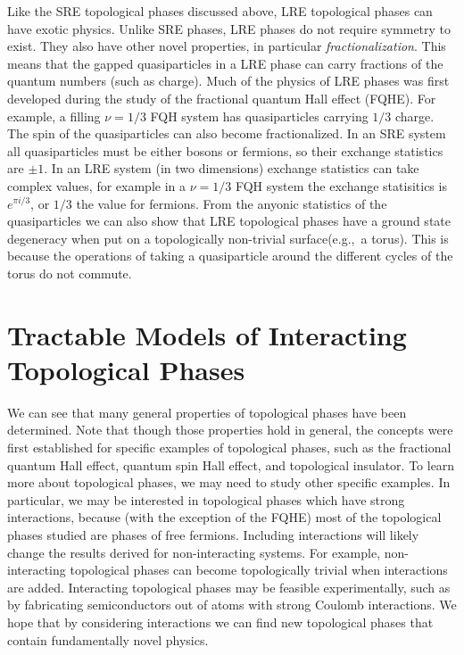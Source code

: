 Like the SRE topological phases discussed above, LRE topological phases can have exotic physics. Unlike SRE phases, LRE phases do not require symmetry to exist. They also have other novel properties, in particular \emph{fractionalization}. This means that the gapped quasiparticles in a LRE phase can carry fractions of the quantum numbers (such as charge). Much of the physics of LRE phases was first developed during the study of the fractional quantum Hall effect (FQHE).\cite{Wen_book} For example, a filling $\nu=1/3$ FQH system has quasiparticles carrying $1/3$ charge\cite{Laughlin-PhysRevLett.50.1395}. The spin of the quasiparticles can also become fractionalized. In an SRE system all quasiparticles must be either bosons or fermions, so their exchange statistics are $\pm 1$. 
In an LRE system (in two dimensions) exchange statistics can take complex values, for example in a $\nu=1/3$ FQH system the exchange statisitics is $e^{\pi i/3}$, or $1/3$ the value for fermions.
From the anyonic statistics of the quasiparticles we can also show that LRE topological phases have a ground state degeneracy when put on a topologically non-trivial surface(e.g.,~a torus). This is because the operations of taking a quasiparticle around the different cycles of the torus do not commute.


\section{Tractable Models of Interacting Topological Phases}

	We can see that many general properties of topological phases have been determined. Note that though those properties hold in general, the concepts were first established for specific examples of topological phases, such as the fractional quantum Hall effect, quantum spin Hall effect, and topological insulator. To learn more about topological phases, we may need to study other specific examples. In particular, we may be interested in topological phases which have strong interactions, because (with the exception of the FQHE) most of the topological phases studied are phases of free fermions.
Including interactions will likely change the results derived for non-interacting systems. For example, non-interacting topological phases can become topologically trivial when interactions are added\cite{FidkowskiKitaev2011}. Interacting topological phases may be feasible experimentally, such as by fabricating semiconductors out of atoms with strong Coulomb interactions\cite{WangSenthil2014}. 
We hope that by considering interactions we can find new topological phases that contain fundamentally novel physics. 

